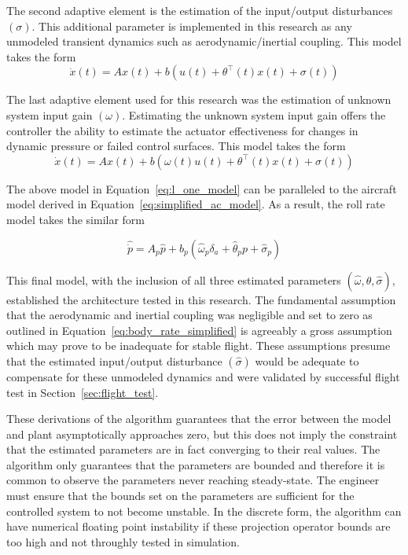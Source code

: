 The second adaptive element is the estimation of the input/output disturbances $(\sigma)$.  This additional parameter is implemented in this research as any unmodeled transient dynamics such as aerodynamic/inertial coupling.  This model takes the form
\begin{equation}
\dot{x}(t)=Ax(t)+b(u(t)+\theta^{\top}(t)x(t)+\sigma(t))
\end{equation}

The last adaptive element used for this research was the estimation of unknown system input gain $(\omega)$.  Estimating the unknown system input gain offers the controller the ability to estimate the actuator effectiveness for changes in dynamic pressure or failed control surfaces.  This model takes the form
\begin{equation}\label{eq:l_one_model}
\dot{x}(t)=Ax(t)+b(\omega(t)u(t)+\theta^{\top}(t)x(t)+\sigma(t))
\end{equation}  

The above model in Equation~\ref{eq:l_one_model} can be paralleled to the aircraft model derived in Equation~\ref{eq:simplified_ac_model}.  As a result, the roll rate model takes the similar form

\begin{equation}
 \hat{\dot{p}}=A_p\hat{p}+b_p\left(\hat{\omega}_p\delta_a+\hat{\theta}_pp+\hat{\sigma}_p\right)
\end{equation}

This final model, with the inclusion of all three estimated parameters $(\hat{\omega}, \hat{\theta}, \hat{\sigma})$, established the architecture tested in this research.  The fundamental assumption that the aerodynamic and inertial coupling was negligible and set to zero as outlined in Equation~\ref{eq:body_rate_simplified} is agreeably a gross assumption which may prove to be inadequate for stable flight.  These assumptions presume that the estimated input/output disturbance $(\hat{\sigma})$ would be adequate to compensate for these unmodeled dynamics and were validated by successful flight test in Section~\ref{sec:flight_test}.  

These derivations of the \Lone algorithm guarantees that the error between the model and plant asymptotically approaches zero, but this does not imply the constraint that the estimated parameters are in fact converging to their real values.  The algorithm only guarantees that the parameters are bounded and therefore it is common to observe the parameters never reaching steady-state.  The engineer must ensure that the bounds set on the parameters are sufficient for the controlled system to not become unstable.  In the discrete form, the algorithm can have numerical floating point instability if these projection operator bounds are too high and not throughly tested in simulation.

